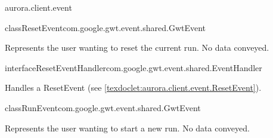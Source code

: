\begin{texdocpackage}{aurora.client.event}
\begin{texdocclass}{class}{ResetEvent}{com.google.gwt.event.shared.GwtEvent}{}
\label{texdoclet:aurora.client.event.ResetEvent}
\begin{texdocclassintro}
Represents the user wanting to reset the current run.
 No data conveyed.\end{texdocclassintro}
\begin{texdocclassfields}
\end{texdocclassfields}
\begin{texdocclassconstructors}
\end{texdocclassconstructors}
\begin{texdocclassmethods}
\end{texdocclassmethods}
\end{texdocclass}


\begin{texdocclass}{interface}{ResetEventHandler}{}{com.google.gwt.event.shared.EventHandler}
\label{texdoclet:aurora.client.event.ResetEventHandler}
\begin{texdocclassintro}
Handles a ResetEvent (see \ref{texdoclet:aurora.client.event.ResetEvent}).\end{texdocclassintro}
\begin{texdocclassmethods}
\end{texdocclassmethods}
\end{texdocclass}


\begin{texdocclass}{class}{RunEvent}{com.google.gwt.event.shared.GwtEvent}{}
\label{texdoclet:aurora.client.event.RunEvent}
\begin{texdocclassintro}
Represents the user wanting to start a new run.
 No data conveyed.\end{texdocclassintro}
\begin{texdocclassfields}
\end{texdocclassfields}
\begin{texdocclassconstructors}
\end{texdocclassconstructors}
\begin{texdocclassmethods}
\end{texdocclassmethods}
\end{texdocclass}



\end{texdocpackage}
